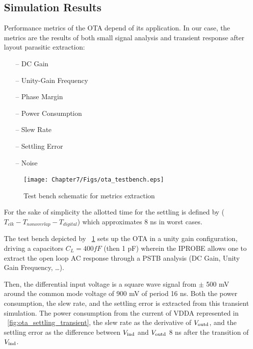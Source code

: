 \subsection{Simulation Results}              %
\label{sec:ota-sim-result}
Performance metrics of the OTA depend of its application. In our case, the metrics are the results of both small signal analysis and transient response after layout parasitic extraction:
\begin{multicols}{2}
    \begin{itemize}
        \itemsep-0.5em
        \item[--] DC Gain
        \item[--] Unity-Gain Frequency
        \item[--] Phase Margin
        \item[--] Power Consumption
        \item[--] Slew Rate
        \item[--] Settling Error
        \item[--] Noise
    \end{itemize}
\end{multicols}

\begin{figure}[htp]
    \centering
    \texttt{[image: Chapter7/Figs/ota\_testbench.eps]}
    \caption{Test bench schematic for metrics extraction}
    \label{fig:ota_testbench}
\end{figure}

For the sake of simplicity the allotted time for the settling is defined by (\(T_{clk} - T_{nonoverlap} - T_{digital}\)) which approximates 8 ns in worst cases.

The test bench depicted by \figurename~\ref{fig:ota_testbench} sets up the OTA in a unity gain configuration, driving a capacitors \(C_L = 400 fF\) (then 1 pF) wherein the IPROBE allows one to extract the open loop AC response through a PSTB analysis (DC Gain, Unity Gain Frequency, \ldots).

Then, the differential input voltage is a square wave signal from \(\pm\) 500 mV around the common mode voltage of 900 mV of period 16 ns. Both the power consumption, the slew rate, and the settling error is extracted from this transient simulation. The power consumption from the current of VDDA represented in \figurename~\ref{fig:ota_settling_transient}, the slew rate as the derivative of $V_{\rm outd}$, and the settling error as the difference between $V_{\rm ind}$ and $V_{\rm outd}$ 8 ns after the transition of $V_{\rm ind}$.

